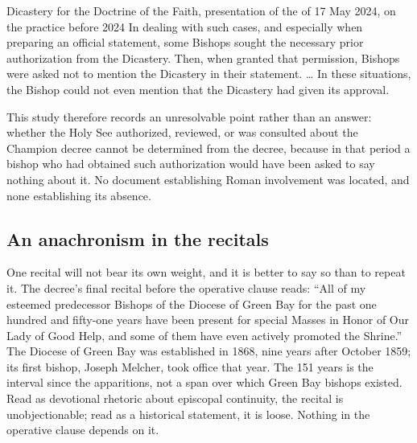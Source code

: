 \begin{witnesstext}{Dicastery for the Doctrine of the Faith,
presentation of the  of 17 May 2024, on the practice before
2024}
In dealing with such cases, and especially when preparing an official
statement, some Bishops sought the necessary prior authorization from
the Dicastery. Then, when granted that permission, Bishops were asked
not to mention the Dicastery in their statement. \dots{} In these
situations, the Bishop could not even mention that the Dicastery had
given its approval.
\end{witnesstext}

This study therefore records an unresolvable point rather than an
answer: whether the Holy See authorized, reviewed, or was consulted
about the Champion decree cannot be determined from the decree, because
in that period a bishop who had obtained such authorization would have
been asked to say nothing about it. No document establishing Roman
involvement was located, and none establishing its absence.

\subsection{An anachronism in the recitals}

One recital will not bear its own weight, and it is better to say so
than to repeat it. The decree's final recital before the operative
clause reads: ``All of my esteemed predecessor Bishops of the Diocese
of Green Bay for the past one hundred and fifty-one years have been
present for special Masses in Honor of Our Lady of Good Help, and some
of them have even actively promoted the Shrine.'' The Diocese of Green Bay was established in 1868,
nine years after October 1859; its first bishop, Joseph Melcher, took
office that year.
The 151 years is the interval since the apparitions, not a span over
which Green Bay bishops existed. Read as devotional rhetoric about
episcopal continuity, the recital is unobjectionable; read as a
historical statement, it is loose. Nothing in the operative clause
depends on it.

